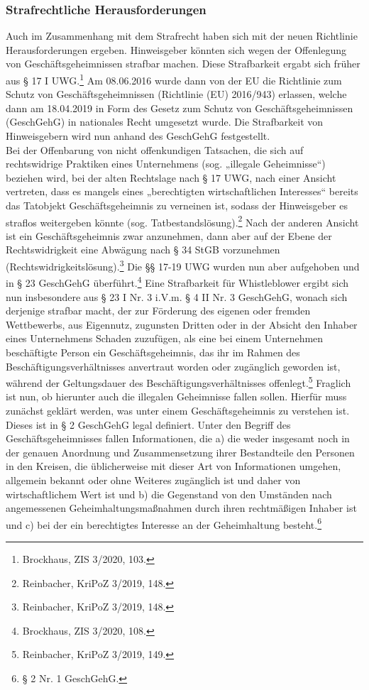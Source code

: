 \subsubsection{Strafrechtliche Herausforderungen}
Auch im Zusammenhang mit dem Strafrecht haben sich mit der neuen Richtlinie Herausforderungen ergeben.
Hinweisgeber könnten sich wegen der Offenlegung von Geschäftsgeheimnissen strafbar machen.
Diese Strafbarkeit ergabt sich früher aus § 17 I UWG.\footnote{Brockhaus, ZIS 3/2020, 103.}
Am 08.06.2016 wurde dann von der EU die Richtlinie zum Schutz von Geschäftsgeheimnissen (Richtlinie (EU) 2016/943) erlassen, welche dann am 18.04.2019 in Form des Gesetz zum Schutz von Geschäftsgeheimnissen (GeschGehG) in nationales Recht umgesetzt wurde.
Die Strafbarkeit von Hinweisgebern wird nun anhand des GeschGehG festgestellt.\\
Bei der Offenbarung von nicht offenkundigen Tatsachen, die sich auf rechtswidrige Praktiken eines Unternehmens (sog. „illegale Geheimnisse“) beziehen wird, bei der alten Rechtslage nach § 17 UWG, nach einer Ansicht vertreten, dass es mangels eines „berechtigten wirtschaftlichen Interesses“ bereits das Tatobjekt Geschäftsgeheimnis zu verneinen ist, sodass der Hinweisgeber es straflos weitergeben könnte (sog. Tatbestandslösung).\footnote{Reinbacher, KriPoZ 3/2019, 148.}
Nach der anderen Ansicht ist ein Geschäftsgeheimnis zwar anzunehmen, dann aber auf der Ebene der Rechtswidrigkeit eine Abwägung nach § 34 StGB vorzunehmen (Rechtswidrigkeitslösung).\footnote{Reinbacher, KriPoZ 3/2019, 148.}
Die §§ 17-19 UWG wurden nun aber aufgehoben und in § 23 GeschGehG überführt.\footnote{Brockhaus, ZIS 3/2020, 108.}
Eine Strafbarkeit für Whistleblower ergibt sich nun insbesondere aus § 23 I Nr. 3 i.V.m. § 4 II Nr. 3 GeschGehG, wonach sich derjenige strafbar macht, der zur Förderung des eigenen oder fremden Wettbewerbs, aus Eigennutz, zugunsten Dritten oder in der Absicht den Inhaber eines Unternehmens Schaden zuzufügen, als eine bei einem Unternehmen beschäftigte Person ein Geschäftsgeheimnis, das ihr im Rahmen des Beschäftigungsverhältnisses anvertraut worden oder zugänglich geworden ist, während der Geltungsdauer des Beschäftigungsverhältnisses offenlegt.\footnote{Reinbacher, KriPoZ 3/2019, 149.}
Fraglich ist nun, ob hierunter auch die illegalen Geheimnisse fallen sollen.
Hierfür muss zunächst geklärt werden, was unter einem Geschäftsgeheimnis zu verstehen ist.
Dieses ist in § 2 GeschGehG legal definiert.
Unter den Begriff des Geschäftsgeheimnisses fallen Informationen, die a) die weder insgesamt noch in der genauen Anordnung und Zusammensetzung ihrer Bestandteile den Personen in den Kreisen, die üblicherweise mit dieser Art von Informationen umgehen, allgemein bekannt oder ohne Weiteres zugänglich ist und daher von wirtschaftlichem Wert ist und b) die Gegenstand von den Umständen nach angemessenen Geheimhaltungsmaßnahmen durch ihren rechtmäßigen Inhaber ist und c) bei der ein berechtigtes Interesse an der Geheimhaltung besteht.\footnote{§ 2 Nr. 1 GeschGehG.}\\

